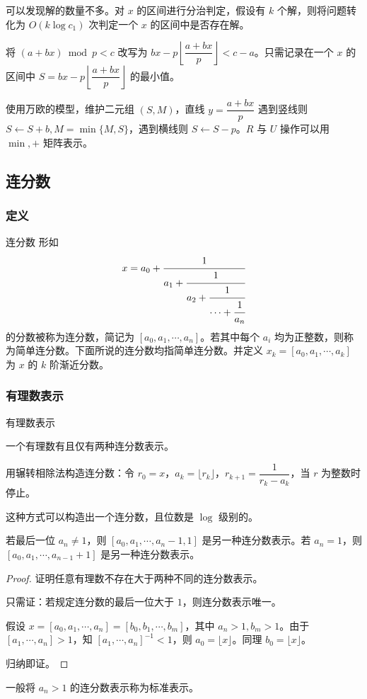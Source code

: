 \documentclass[../main.tex]{subfiles}
\begin{document}
\begin{frame}
可以发现解的数量不多。对 $x$ 的区间进行分治判定，假设有 $k$ 个解，则将问题转化为 $O(k\log c_1)$ 次判定一个 $x$ 的区间中是否存在解。\pause

将 $(a+bx)\bmod p<c$ 改写为 $bx-p\left\lfloor\dfrac{a+bx}{p} \right\rfloor<c-a$。只需记录在一个 $x$ 的区间中 $S=bx-p\left\lfloor\dfrac{a+bx}{p}\right\rfloor$ 的最小值。\pause

使用万欧的模型，维护二元组 $(S,M)$，直线 $y=\dfrac{a+bx}{p}$ 遇到竖线则 $S\leftarrow S+b,M=\min\{M,S\}$，遇到横线则 $S\leftarrow S-p$。$R$ 与 $U$ 操作可以用 $\min,+$ 矩阵表示。
\end{frame}

\subsection{连分数}

\subsubsection{定义}

\begin{frame}{连分数}
形如
$$
x = a_0 + \cfrac{1}{a_1 + \cfrac{1}{a_2 +\cfrac{1}{\cdots+\cfrac{1}{a_n}}}}
$$
的分数被称为连分数，简记为 $[a_0,a_1,\cdots,a_n]$。若其中每个 $a_i$ 均为正整数，则称为简单连分数。下面所说的连分数均指简单连分数。并定义 $x_k=[a_0,a_1,\cdots,a_k]$ 为 $x$ 的 $k$ 阶渐近分数。
\end{frame}

\subsubsection{有理数表示}

\begin{frame}{有理数表示}
\begin{theo}
一个有理数有且仅有两种连分数表示。
\end{theo}\pause

用辗转相除法构造连分数：令 $r_0=x$，$a_k=\lfloor r_k\rfloor$，$r_{k+1}=\dfrac{1}{r_k-a_k}$，当 $r$ 为整数时停止。\pause

这种方式可以构造出一个连分数，且位数是 $\log$ 级别的。\pause

若最后一位 $a_n\neq 1$，则 $[a_0,a_1,\cdots,a_n-1,1]$ 是另一种连分数表示。若 $a_n=1$，则 $[a_0,a_1,\cdots,a_{n-1}+1]$ 是另一种连分数表示。
\end{frame}

\begin{frame}
\begin{proof}
证明任意有理数不存在大于两种不同的连分数表示。\pause

只需证：若规定连分数的最后一位大于 $1$，则连分数表示唯一。\pause

假设 $x=[a_0,a_1,\cdots,a_n]=[b_0,b_1,\cdots,b_m]$，其中 $a_n>1,b_m>1$。由于 $[a_1,\cdots,a_n]>1$，知 $[a_1,\cdots,a_n]^{-1}<1$，则 $a_0=\lfloor x\rfloor$。同理 $b_0=\lfloor x\rfloor$。\pause

归纳即证。
\end{proof}\pause

一般将 $a_n>1$ 的连分数表示称为标准表示。
\end{frame}
\end{document}

